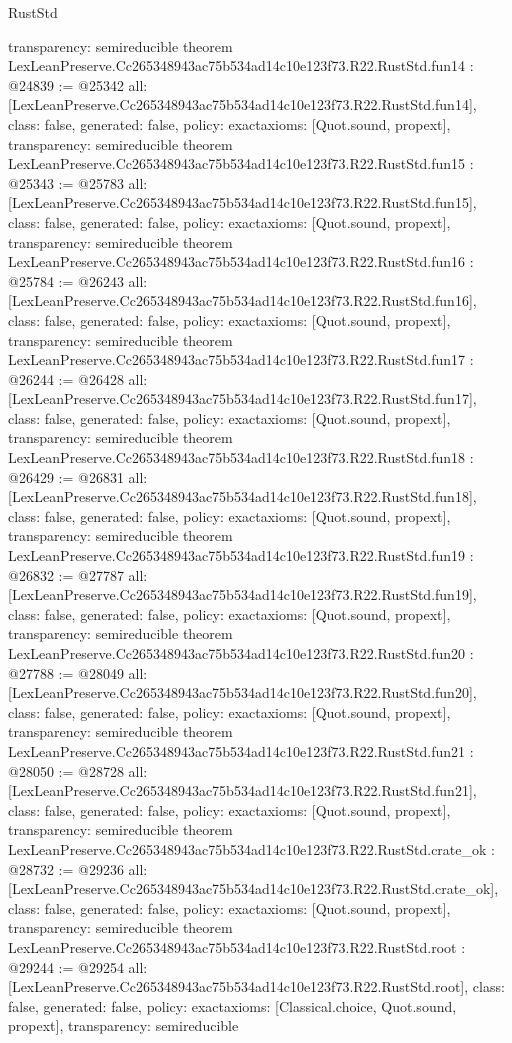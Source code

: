 \begin{lexlean}{RustStd}
\begin{coremodule}
{  transparency: semireducible
}
theorem LexLeanPreserve.Cc265348943ac75b534ad14c10e123f73.R22.RustStd.fun14 : @24839 := @25342 {
  all: [LexLeanPreserve.Cc265348943ac75b534ad14c10e123f73.R22.RustStd.fun14],
  class: false,
  generated: false,
  policy: exact{axioms: [Quot.sound, propext]},
  transparency: semireducible
}
theorem LexLeanPreserve.Cc265348943ac75b534ad14c10e123f73.R22.RustStd.fun15 : @25343 := @25783 {
  all: [LexLeanPreserve.Cc265348943ac75b534ad14c10e123f73.R22.RustStd.fun15],
  class: false,
  generated: false,
  policy: exact{axioms: [Quot.sound, propext]},
  transparency: semireducible
}
theorem LexLeanPreserve.Cc265348943ac75b534ad14c10e123f73.R22.RustStd.fun16 : @25784 := @26243 {
  all: [LexLeanPreserve.Cc265348943ac75b534ad14c10e123f73.R22.RustStd.fun16],
  class: false,
  generated: false,
  policy: exact{axioms: [Quot.sound, propext]},
  transparency: semireducible
}
theorem LexLeanPreserve.Cc265348943ac75b534ad14c10e123f73.R22.RustStd.fun17 : @26244 := @26428 {
  all: [LexLeanPreserve.Cc265348943ac75b534ad14c10e123f73.R22.RustStd.fun17],
  class: false,
  generated: false,
  policy: exact{axioms: [Quot.sound, propext]},
  transparency: semireducible
}
theorem LexLeanPreserve.Cc265348943ac75b534ad14c10e123f73.R22.RustStd.fun18 : @26429 := @26831 {
  all: [LexLeanPreserve.Cc265348943ac75b534ad14c10e123f73.R22.RustStd.fun18],
  class: false,
  generated: false,
  policy: exact{axioms: [Quot.sound, propext]},
  transparency: semireducible
}
theorem LexLeanPreserve.Cc265348943ac75b534ad14c10e123f73.R22.RustStd.fun19 : @26832 := @27787 {
  all: [LexLeanPreserve.Cc265348943ac75b534ad14c10e123f73.R22.RustStd.fun19],
  class: false,
  generated: false,
  policy: exact{axioms: [Quot.sound, propext]},
  transparency: semireducible
}
theorem LexLeanPreserve.Cc265348943ac75b534ad14c10e123f73.R22.RustStd.fun20 : @27788 := @28049 {
  all: [LexLeanPreserve.Cc265348943ac75b534ad14c10e123f73.R22.RustStd.fun20],
  class: false,
  generated: false,
  policy: exact{axioms: [Quot.sound, propext]},
  transparency: semireducible
}
theorem LexLeanPreserve.Cc265348943ac75b534ad14c10e123f73.R22.RustStd.fun21 : @28050 := @28728 {
  all: [LexLeanPreserve.Cc265348943ac75b534ad14c10e123f73.R22.RustStd.fun21],
  class: false,
  generated: false,
  policy: exact{axioms: [Quot.sound, propext]},
  transparency: semireducible
}
theorem LexLeanPreserve.Cc265348943ac75b534ad14c10e123f73.R22.RustStd.crate_ok : @28732 := @29236 {
  all: [LexLeanPreserve.Cc265348943ac75b534ad14c10e123f73.R22.RustStd.crate_ok],
  class: false,
  generated: false,
  policy: exact{axioms: [Quot.sound, propext]},
  transparency: semireducible
}
theorem LexLeanPreserve.Cc265348943ac75b534ad14c10e123f73.R22.RustStd.root : @29244 := @29254 {
  all: [LexLeanPreserve.Cc265348943ac75b534ad14c10e123f73.R22.RustStd.root],
  class: false,
  generated: false,
  policy: exact{axioms: [Classical.choice, Quot.sound, propext]},
  transparency: semireducible
}


\end{coremodule}
\end{lexlean}

